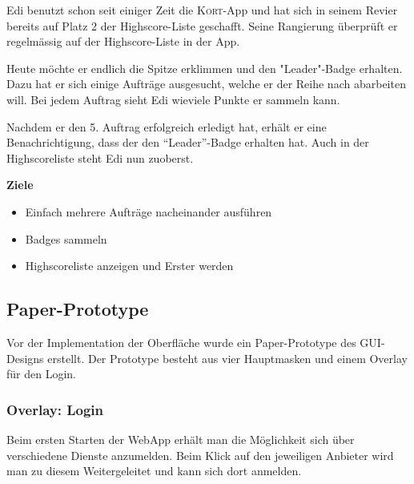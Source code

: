 Edi benutzt schon seit einiger Zeit die \textsc{Kort}-App und hat sich in seinem Revier bereits auf Platz 2 der Highscore-Liste geschafft.
Seine Rangierung überprüft er regelmässig auf der Highscore-Liste in der App.

Heute möchte er endlich die Spitze erklimmen und den "Leader"-Badge erhalten.
Dazu hat er sich einige Aufträge ausgesucht, welche er der Reihe nach abarbeiten will.
Bei jedem Auftrag sieht Edi wieviele Punkte er sammeln kann.

Nachdem er den 5. Auftrag erfolgreich erledigt hat, erhält er eine Benachrichtigung, dass der den "`Leader"'-Badge erhalten hat.
Auch in der Highscoreliste steht Edi nun zuoberst.

\textbf{Ziele}
\begin{itemize}
\item Einfach mehrere Aufträge nacheinander ausführen
\item Badges sammeln
\item Highscoreliste anzeigen und Erster werden
\end{itemize}

\subsection{Paper-Prototype}
\setcounter{subfigure}{0}

Vor der Implementation der Oberfläche wurde ein Paper-Prototype des GUI-Designs erstellt.
Der Prototype besteht aus vier Hauptmasken und einem Overlay für den Login.

\subsubsection{Overlay: Login}
Beim ersten Starten der \gls{WebApp} erhält man die Möglichkeit sich über verschiedene Dienste anzumelden.
Beim Klick auf den jeweiligen Anbieter wird man zu diesem Weitergeleitet und kann sich dort anmelden.

